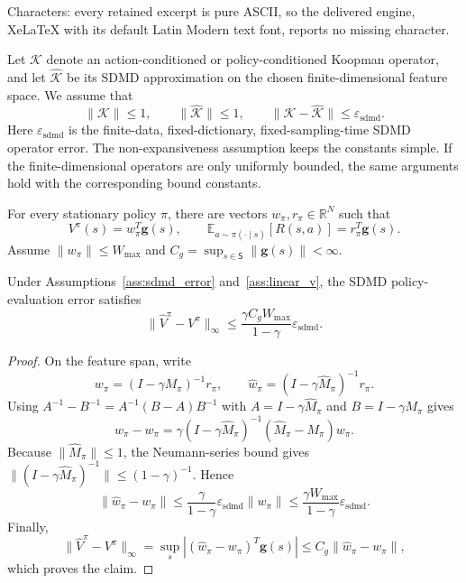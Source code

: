 \documentclass[10pt,a4paper]{amsart}
\begin{document}
Characters: every retained excerpt is pure ASCII, so the delivered engine, XeLaTeX with its default Latin Modern text font, reports no missing character.
\begin{assumption}\label{ass:sdmd_error}
Let $\mathcal{K}$ denote an action-conditioned or policy-conditioned Koopman operator, and let $\widehat{\mathcal{K}}$ be its SDMD approximation on the chosen finite-dimensional feature space. We assume that
\begin{equation*}
    \|\mathcal{K}\|\le1,
    \qquad
    \|\widehat{\mathcal{K}}\|\le1,
    \qquad
    \|\mathcal{K}-\widehat{\mathcal{K}}\|\le\varepsilon_{\mathrm{sdmd}}.
\end{equation*}
Here $\varepsilon_{\mathrm{sdmd}}$ is the finite-data, fixed-dictionary, fixed-sampling-time SDMD operator error. The non-expansiveness assumption keeps the constants simple. If the finite-dimensional operators are only uniformly bounded, the same arguments hold with the corresponding bound constants.
\end{assumption}

\begin{assumption}\label{ass:linear_v}
For every stationary policy $\pi$, there are vectors $w_\pi,r_\pi\in\mathbb{R}^N$ such that
\[
    V^\pi(s)=w_\pi^T\mathbf{g}(s),
    \qquad
    \mathbb{E}_{a\sim\pi(\cdot\mid s)}[R(s,a)]=r_\pi^T\mathbf{g}(s).
\]
Assume $\|w_\pi\|\le W_{\max}$ and $C_g=\sup_{s\in\mathsf{S}}\|\mathbf{g}(s)\|<\infty$.
\end{assumption}

\begin{lemma}\label{lemma:value_error}
Under Assumptions~\ref{ass:sdmd_error} and~\ref{ass:linear_v}, the SDMD policy-evaluation error satisfies
\begin{equation*}
\|\widehat V^\pi-V^\pi\|_\infty
\le
\frac{\gamma C_g W_{\max}}{1-\gamma}\varepsilon_{\mathrm{sdmd}}.
\end{equation*}
\end{lemma}

\begin{proof}
On the feature span, write
\[
 w_\pi=(I-\gamma M_\pi)^{-1}r_\pi,
 \qquad
 \widehat w_\pi=(I-\gamma\widehat M_\pi)^{-1}r_\pi.
\]
Using $A^{-1}-B^{-1}=A^{-1}(B-A)B^{-1}$ with $A=I-\gamma\widehat M_\pi$ and $B=I-\gamma M_\pi$ gives
\[
\widehat w_\pi-w_\pi
=
\gamma(I-\gamma\widehat M_\pi)^{-1}(\widehat M_\pi-M_\pi)w_\pi.
\]
Because $\|\widehat M_\pi\|\le1$, the Neumann-series bound gives $\|(I-\gamma\widehat M_\pi)^{-1}\|\le(1-\gamma)^{-1}$. Hence
\[
\|\widehat w_\pi-w_\pi\|
\le
\frac{\gamma}{1-\gamma}\varepsilon_{\mathrm{sdmd}}\|w_\pi\|
\le
\frac{\gamma W_{\max}}{1-\gamma}\varepsilon_{\mathrm{sdmd}}.
\]
Finally,
\[
\|\widehat V^\pi-V^\pi\|_\infty
=\sup_s|(\widehat w_\pi-w_\pi)^T\mathbf g(s)|
\le
C_g\|\widehat w_\pi-w_\pi\|,
\]
which proves the claim.
\end{proof}
\end{document}
